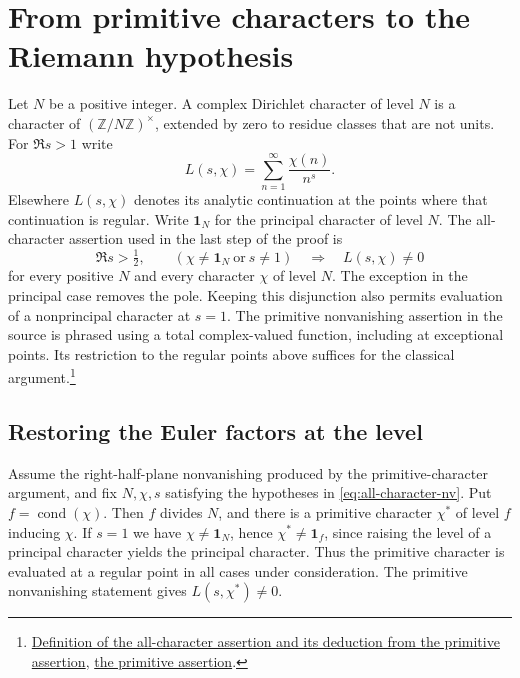 \section{From primitive characters to the Riemann hypothesis}
\label{sec:character-to-rh}

Let \(N\) be a positive integer. A complex Dirichlet character of level
\(N\) is a character of \((\mathbb Z/N\mathbb Z)^\times\), extended by
zero to residue classes that are not units. For \(\Re s>1\) write
\[
       L(s,\chi)=\sum_{n=1}^{\infty}\frac{\chi(n)}{n^s}.
\]
Elsewhere \(L(s,\chi)\) denotes its analytic continuation at the points
where that continuation is regular. Write \(\mathbf 1_N\) for the
principal character of level \(N\). The all-character assertion used
in the last step of the proof is
\begin{equation}
\label{eq:all-character-nv}
   \Re s>\tfrac12,\qquad
   (\chi\ne\mathbf 1_N\ \text{or}\ s\ne 1)
       \quad\Longrightarrow\quad L(s,\chi)\ne0
\end{equation}
for every positive \(N\) and every character \(\chi\) of level \(N\).
The exception in the principal case removes the pole. Keeping this
disjunction also permits evaluation of a nonprincipal character at
\(s=1\). The primitive nonvanishing assertion in the source is phrased
using a total complex-valued function, including at exceptional points.
Its restriction to the regular points above suffices for the
classical argument.\footnote{\href{https://github.com/Deicyde/riemann-hypothesis/blob/40e56bab/src/Development/AutomorphicArithmetic/CharacterBoxes/EveryCharacter.lean\#L13-L18}{Definition of the all-character assertion and its deduction from the primitive assertion},
\href{https://github.com/Deicyde/riemann-hypothesis/blob/40e56bab/src/Formalism/SharpRestriction/RamificationFrobenius/TotientGaloisClasses/ExplicitFormulaErrorOfHostConditions.lean\#L11-L18}{the primitive assertion}.}

\subsection{Restoring the Euler factors at the level}
\label{sec:restore-euler}

Assume the right-half-plane nonvanishing produced by the primitive-character
argument, and fix \(N,\chi,s\) satisfying the hypotheses in
\eqref{eq:all-character-nv}. Put \(f=\operatorname{cond}(\chi)\).
Then \(f\) divides \(N\), and there is a primitive character \(\chi^*\)
of level \(f\) inducing \(\chi\). If \(s=1\) we have
\(\chi\ne\mathbf 1_N\), hence \(\chi^*\ne\mathbf 1_f\), since raising
the level of a principal character yields the principal character.
Thus the primitive character is evaluated at a regular point in all
cases under consideration. The primitive nonvanishing statement gives
\(L(s,\chi^*)\ne0\).

